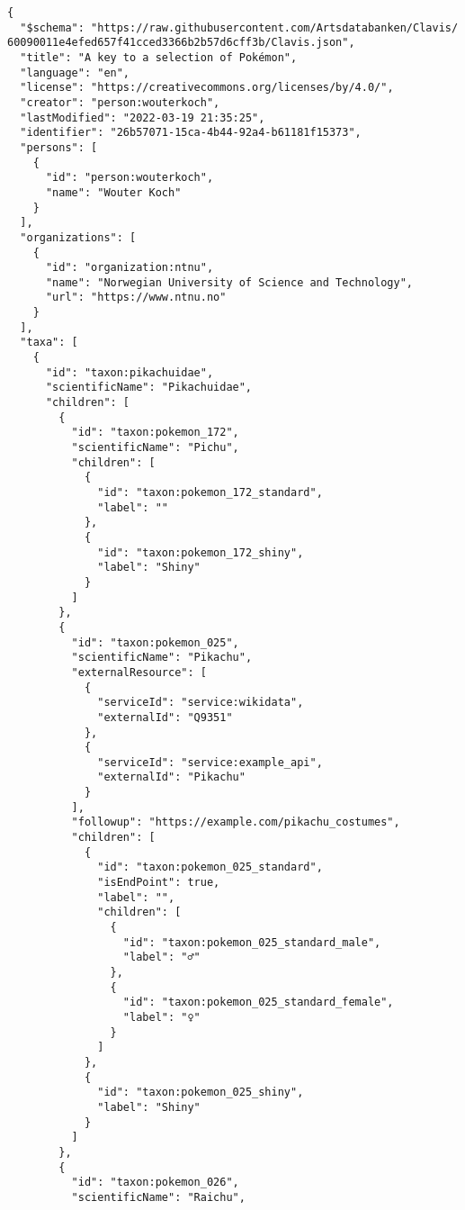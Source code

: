 \documentclass[10pt,letterpaper]{article}
\begin{document}
\vspace*{0.2in}

\begin{flushleft}
{\Large
\textbf{}}
\newline
\end{flushleft}
\linenumbers
\begin{verbatim}
{
  "$schema": "https://raw.githubusercontent.com/Artsdatabanken/Clavis/
60090011e4efed657f41cced3366b2b57d6cff3b/Clavis.json",
  "title": "A key to a selection of Pokémon",
  "language": "en",
  "license": "https://creativecommons.org/licenses/by/4.0/",
  "creator": "person:wouterkoch",
  "lastModified": "2022-03-19 21:35:25",
  "identifier": "26b57071-15ca-4b44-92a4-b61181f15373",
  "persons": [
    {
      "id": "person:wouterkoch",
      "name": "Wouter Koch"
    }
  ],
  "organizations": [
    {
      "id": "organization:ntnu",
      "name": "Norwegian University of Science and Technology",
      "url": "https://www.ntnu.no"
    }
  ],
  "taxa": [
    {
      "id": "taxon:pikachuidae",
      "scientificName": "Pikachuidae",
      "children": [
        {
          "id": "taxon:pokemon_172",
          "scientificName": "Pichu",
          "children": [
            {
              "id": "taxon:pokemon_172_standard",
              "label": ""
            },
            {
              "id": "taxon:pokemon_172_shiny",
              "label": "Shiny"
            }
          ]
        },
        {
          "id": "taxon:pokemon_025",
          "scientificName": "Pikachu",
          "externalResource": [
            {
              "serviceId": "service:wikidata",
              "externalId": "Q9351"
            },
            {
              "serviceId": "service:example_api",
              "externalId": "Pikachu"
            }
          ],
          "followup": "https://example.com/pikachu_costumes",
          "children": [
            {
              "id": "taxon:pokemon_025_standard",
              "isEndPoint": true,
              "label": "",
              "children": [
                {
                  "id": "taxon:pokemon_025_standard_male",
                  "label": "♂"
                },
                {
                  "id": "taxon:pokemon_025_standard_female",
                  "label": "♀"
                }
              ]
            },
            {
              "id": "taxon:pokemon_025_shiny",
              "label": "Shiny"
            }
          ]
        },
        {
          "id": "taxon:pokemon_026",
          "scientificName": "Raichu",

\end{verbatim}
\end{document}
